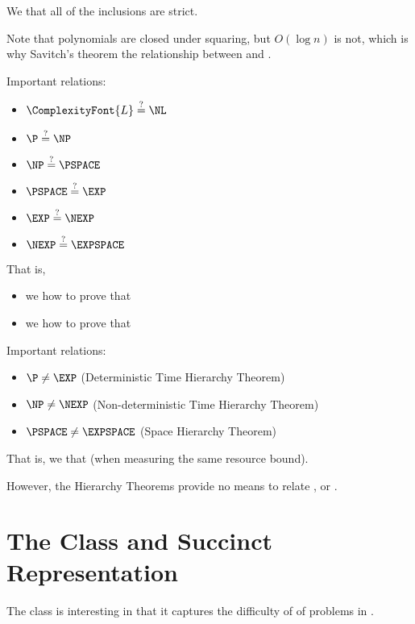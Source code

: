 \documentclass[a4paper]{report}
\theoremstyle{definition}
\begin{document}
We  that all of the inclusions are strict.

Note that polynomials are closed under squaring, but $O(\log n)$ is not, which is why Savitch's theorem  the relationship between  and \NL{}.

Important  relations:
\begin{itemize}
\item $\ComplexityFont{L} \stackrel{?}{=} \NL$
\item $\P \stackrel{?}{=} \NP$
\item $\NP \stackrel{?}{=} \PSPACE$
\item $\PSPACE \stackrel{?}{=} \EXP$
\item $\EXP \stackrel{?}{=} \NEXP$
\item $\NEXP \stackrel{?}{=} \EXPSPACE$
\end{itemize}

That is,
\begin{itemize}
\item we  how to prove that 
\item we  how to prove that 
\end{itemize}

Important  relations:
\begin{itemize}
\item $\P \neq \EXP$ (Deterministic Time Hierarchy Theorem)
\item $\NP \neq \NEXP$ (Non-deterministic Time Hierarchy Theorem)
\item $\PSPACE \neq \EXPSPACE$ (Space Hierarchy Theorem)
\end{itemize}

That is, we  that  (when measuring the same resource bound).

However, the Hierarchy Theorems provide no means to relate , or .


\section{The Class \NEXP{} and Succinct Representation}
The class \NEXP{} is interesting in that it captures the difficulty of  of problems in \NP.
\end{document}
